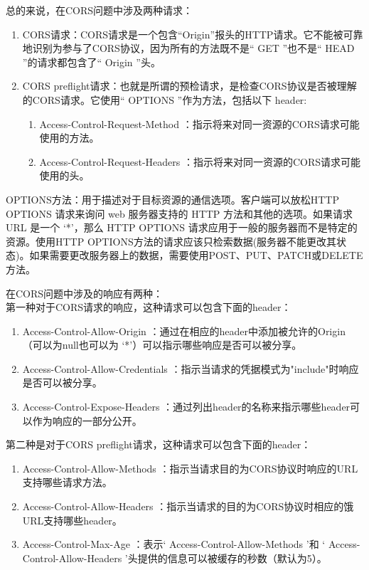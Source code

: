 总的来说，在CORS问题中涉及两种请求：

\begin{enumerate}
  \item CORS请求：CORS请求是一个包含“Origin”报头的HTTP请求。它不能被可靠地识别为参与了CORS协议，因为所有的方法既不是“ GET ”也不是“ HEAD ”的请求都包含了“ Origin ”头。
  \item CORS preflight请求：也就是所谓的预检请求，是检查CORS协议是否被理解的CORS请求。它使用“ OPTIONS ”作为方法，包括以下 header:
        \begin{enumerate}
          \item  Access-Control-Request-Method ：指示将来对同一资源的CORS请求可能使用的方法。
          \item  Access-Control-Request-Headers ：指示将来对同一资源的CORS请求可能使用的头。
        \end{enumerate}
\end{enumerate}

OPTIONS方法：用于描述对于目标资源的通信选项。客户端可以放松HTTP OPTIONS 请求来询问 web 服务器支持的 HTTP 方法和其他的选项。如果请求 URL 是一个 ‘*’，那么 HTTP OPTIONS 请求应用于一般的服务器而不是特定的资源。使用HTTP OPTIONS方法的请求应该只检索数据(服务器不能更改其状态)。如果需要更改服务器上的数据，需要使用POST、PUT、PATCH或DELETE方法。

在CORS问题中涉及的响应有两种：\\
第一种对于CORS请求的响应，这种请求可以包含下面的header：
\begin{enumerate}
  \item  Access-Control-Allow-Origin ：通过在相应的header中添加被允许的Origin（可以为null也可以为 ‘*’）可以指示哪些响应是否可以被分享。
  \item  Access-Control-Allow-Credentials ：指示当请求的凭据模式为"include"时响应是否可以被分享。
  \item  Access-Control-Expose-Headers ：通过列出header的名称来指示哪些header可以作为响应的一部分公开。
\end{enumerate}
第二种是对于CORS preflight请求，这种请求可以包含下面的header：
\begin{enumerate}
  \item  Access-Control-Allow-Methods ：指示当请求目的为CORS协议时响应的URL支持哪些请求方法。
  \item  Access-Control-Allow-Headers ：指示当请求的目的为CORS协议时相应的饿URL支持哪些header。
  \item  Access-Control-Max-Age ：表示‘ Access-Control-Allow-Methods ’和  ‘ Access-Control-Allow-Headers ’头提供的信息可以被缓存的秒数（默认为5）。
\end{enumerate}

